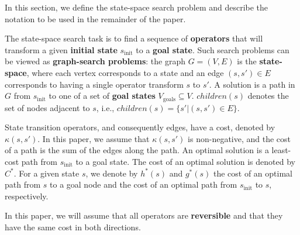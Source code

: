 \documentclass[letterpaper]{article}
\begin{document}
In this section, we define the state-space search problem and describe the notation to be used in the remainder of the paper.

The state-space search task is to find a sequence of \textbf{operators} that will transform  a given \textbf{initial state} $s_{\mathrm{init}}$ to a \textbf{goal state}. Such search problems can be viewed as \textbf{graph-search problems}: the graph $G = (V, E)$ is the \textbf{state-space}, where each vertex corresponds to a state and an edge $(s,s')\in E$ corresponds to having a single operator transform $s$ to $s'$. 
A solution is a path in $G$ from $s_{\mathrm{init}}$ to one of a set of \textbf{goal states} $V_{\mathrm{goals}}\subseteq V$. $children(s)$ denotes the set of nodes adjacent to $s$, i.e., $children(s) = \{ s' | (s,s') \in E\}$.  %

State transition operators, and consequently edges, have a cost, denoted by $\kappa(s, s')$. In this paper, we assume that $\kappa(s, s')$ is non-negative, and the cost of a path is the sum of the edges along the path. An optimal solution is a least-cost path from $s_{\mathrm{init}}$ to a goal state. The cost of an optimal solution is denoted by $C^*$. For a given state $s$, we denote by $h^*(s)$ and $g^*(s)$ the cost of an optimal path from $s$ to a goal node and the cost of an optimal path from $s_{\mathrm{init}}$ to $s$, respectively. %

In this paper, we will assume that all operators are \textbf{reversible} and that they have the same cost in both directions.


\end{document}

